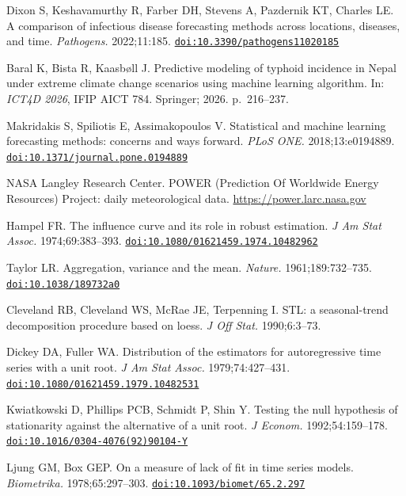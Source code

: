 \documentclass[11pt]{article}
\begin{document}
\begin{enumerate}[label={[\arabic*]},leftmargin=2.2em,itemsep=0.5pt]
\item\hypertarget{ref8}{}Dixon S, Keshavamurthy R, Farber DH, Stevens A, Pazdernik KT, Charles LE. A comparison of infectious disease forecasting methods across locations, diseases, and time. \textit{Pathogens.} 2022;11:185. \href{https://doi.org/10.3390/pathogens11020185}{\nolinkurl{doi:10.3390/pathogens11020185}}
\item\hypertarget{ref9}{}Baral K, Bista R, Kaasbøll J. Predictive modeling of typhoid incidence in Nepal under extreme climate change scenarios using machine learning algorithm. In: \textit{ICT4D 2026}, IFIP AICT 784. Springer; 2026. p.~216--237.
\item\hypertarget{ref10}{}Makridakis S, Spiliotis E, Assimakopoulos V. Statistical and machine learning forecasting methods: concerns and ways forward. \textit{PLoS ONE.} 2018;13:e0194889. \href{https://doi.org/10.1371/journal.pone.0194889}{\nolinkurl{doi:10.1371/journal.pone.0194889}}
\item\hypertarget{ref11}{}NASA Langley Research Center. POWER (Prediction Of Worldwide Energy Resources) Project: daily meteorological data. \url{https://power.larc.nasa.gov}
\item\hypertarget{ref12}{}Hampel FR. The influence curve and its role in robust estimation. \textit{J Am Stat Assoc.} 1974;69:383--393. \href{https://doi.org/10.1080/01621459.1974.10482962}{\nolinkurl{doi:10.1080/01621459.1974.10482962}}
\item\hypertarget{ref13}{}Taylor LR. Aggregation, variance and the mean. \textit{Nature.} 1961;189:732--735. \href{https://doi.org/10.1038/189732a0}{\nolinkurl{doi:10.1038/189732a0}}
\item\hypertarget{ref14}{}Cleveland RB, Cleveland WS, McRae JE, Terpenning I. STL: a seasonal-trend decomposition procedure based on loess. \textit{J Off Stat.} 1990;6:3--73.
\item\hypertarget{ref15}{}Dickey DA, Fuller WA. Distribution of the estimators for autoregressive time series with a unit root. \textit{J Am Stat Assoc.} 1979;74:427--431. \href{https://doi.org/10.1080/01621459.1979.10482531}{\nolinkurl{doi:10.1080/01621459.1979.10482531}}
\item\hypertarget{ref16}{}Kwiatkowski D, Phillips PCB, Schmidt P, Shin Y. Testing the null hypothesis of stationarity against the alternative of a unit root. \textit{J Econom.} 1992;54:159--178. \href{https://doi.org/10.1016/0304-4076(92)90104-Y}{\nolinkurl{doi:10.1016/0304-4076(92)90104-Y}}
\item\hypertarget{ref17}{}Ljung GM, Box GEP. On a measure of lack of fit in time series models. \textit{Biometrika.} 1978;65:297--303. \href{https://doi.org/10.1093/biomet/65.2.297}{\nolinkurl{doi:10.1093/biomet/65.2.297}}

\end{enumerate}
\end{document}
